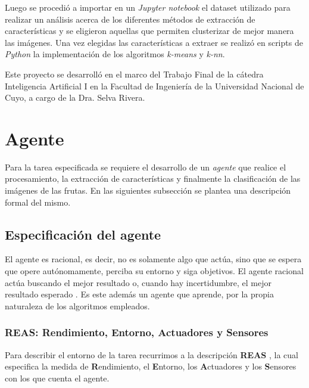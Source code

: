 \documentclass[10pt, a4paper]{article}
\begin{document}
Luego se procedió a importar en un \textit{Jupyter notebook} el dataset utilizado para realizar un análisis acerca de los diferentes métodos de extracción de características y se eligieron aquellas que permiten clusterizar de mejor manera las imágenes. Una vez elegidas las características a extraer se realizó en scripts de \textit{Python} la implementación de los algoritmos \textit{k-means} y \textit{k-nn}.

Este proyecto se desarrolló en el marco del Trabajo Final de la cátedra Inteligencia Artificial I en la Facultad de Ingeniería de la Universidad Nacional de Cuyo, a cargo de la Dra. Selva Rivera.

\section{Agente}

Para la tarea especificada se requiere el desarrollo de un \textit{agente} que realice el procesamiento, la extracción de características y finalmente la clasificación de las imágenes de las frutas. En las siguientes subsección se plantea una descripción formal del mismo.

\subsection{Especificación del agente}

El agente es racional, es decir, no es solamente algo que actúa, sino que se espera que opere autónomamente, perciba su entorno y siga objetivos. El agente racional actúa buscando el mejor resultado o, cuando hay incertidumbre, el mejor resultado esperado \cite{russell-norvig}. Es este además un agente que aprende, por la propia naturaleza de los algoritmos empleados.

\subsubsection{REAS: Rendimiento, Entorno, Actuadores  y Sensores}

Para describir el entorno de la tarea recurrimos a la descripción \textbf{REAS} \cite{russell-norvig}, la cual especifica la medida de \textbf{R}endimiento, el \textbf{E}ntorno, los \textbf{A}ctuadores y los \textbf{S}ensores con los que cuenta el agente.
\end{document}
